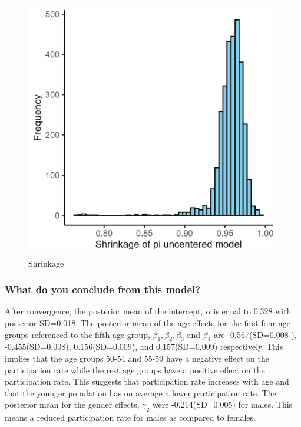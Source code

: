 \documentclass[12pt]{article}
\begin{document}
\begin{figure}[H] 
    \centering    \includegraphics[width=0.8\linewidth]{pictures/fig-07-shrinkage-uncentered.png}
    \caption{Shrinkage}
    \label{fig:shrinkage-uncentered}
\end{figure}

\subsubsection{What do you conclude from this model?}

After convergence, the posterior mean of the intercept, $\alpha$ is equal to 0.328 with posterior SD=0.018. The posterior mean of the age effects for the first four age-groups referenced to the fifth age-group, $\beta_1, \beta_2, \beta_3$ and $\beta_4$ are -0.567(SD=0.008 ), -0.455(SD=0.008), 0.156(SD=0.009), and 0.157(SD=0.009) respectively. This implies that the age groups 50-54 and 55-59 have a negative effect on the participation rate while the rest age groups have a positive effect on the participation rate. This suggests that participation rate increases with age and that the younger population has on average a lower participation rate. The posterior mean for the gender effects, $\gamma_2$ were -0.214(SD=0.005) for males. This means a reduced participation rate for males as compared to females.   
\end{document}
